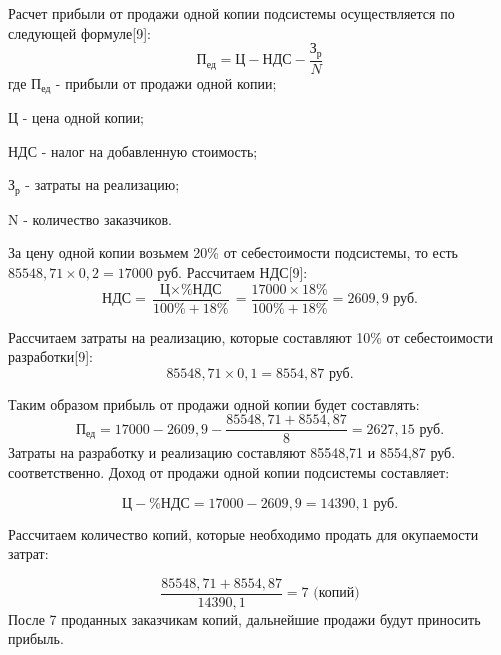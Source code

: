 \documentclass[a4paper]{extarticle}
\numberwithin{equation}{section}
\begin{document}
Расчет прибыли от продажи одной копии подсистемы осуществляется по следующей формуле[9]:
\begin{equation}
\label{form13}
	\text{П}_\text{ед}=\text{Ц}-\text{НДС}-\frac{\text{З}_\text{р}}{N}
\end{equation}
где $\text{П}_\text{ед}$ - прибыли от продажи одной копии;\par
$\text{Ц}$ - цена одной копии;\par
$\text{НДС}$ - налог на добавленную стоимость;\par
$\text{З}_\text{р}$ - затраты на реализацию;\par
N - количество заказчиков.\par
За цену одной копии возьмем 20\% от себестоимости подсистемы, то есть $85548,71\times 0,2 = 17000$ руб.
Рассчитаем НДС[9]:
\begin{equation}
\label{form14}
	\text{НДС}=\frac{\text{Ц}\times \text{\%НДС}}{100\%+18\%}=\frac{17000\times 18\%}{100\%+18\%}=2609,9 \text{ руб.}
\end{equation}\par
Рассчитаем затраты на реализацию, которые составляют 10\% от себестоимости разработки[9]:
\begin{equation}
\label{form15}
	85548,71\times 0,1 = 8554,87 \text{ руб.}
\end{equation}\par
Таким образом прибыль от продажи одной копии будет составлять:
\begin{equation}
\label{form16}
	\text{П}_\text{ед}=17000-2609,9-\frac{85548,71+8554,87}{8}=2627,15\text{ руб.}
\end{equation}
Затраты на разработку и реализацию составляют 85548,71 и 8554,87 руб. соответственно. Доход от продажи одной копии подсистемы составляет:\par
\begin{equation}
\label{form17}
	\text{Ц}-\text{\%НДС} = 17000-2609,9 = 14390,1 \text{ руб.}
\end{equation}\par
Рассчитаем количество копий, которые необходимо продать для окупаемости затрат:\par
\begin{equation}
\label{form18}
	\frac{85548,71+8554,87}{14390,1}=7 \text{ (копий)}
\end{equation}
После 7 проданных заказчикам копий, дальнейшие продажи будут приносить прибыль.
\end{document}

